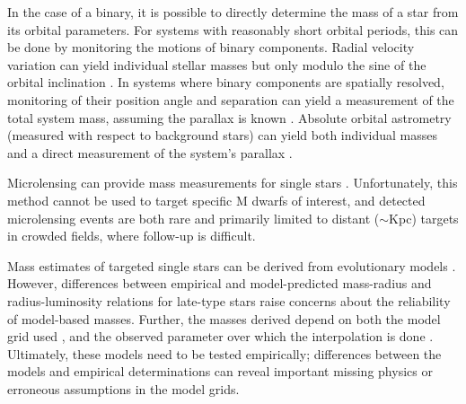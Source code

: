 \documentclass[twocolumn]{aastex62}
\begin{document}
In the case of a binary, it is possible to directly determine the mass of a star from its orbital parameters. For systems with reasonably short orbital periods, this can be done by monitoring the motions of binary components.  Radial velocity variation can yield individual stellar masses but only modulo the sine of the orbital inclination \citep[e.g.,][]{Torres2002,Kraus2011,Stevens:2018aa}. In systems where binary components are spatially resolved, monitoring of their position angle and separation can yield a measurement of the total system mass, assuming the parallax is known \citep[e.g.,][]{Soderhjelm1999,Woi2003,2009ApJ...699..168D}. Absolute orbital astrometry (measured with respect to background stars) can yield both individual masses and a direct measurement of the system's parallax \citep[e.g.,][]{Koh2012,Benedict2016}. 

Microlensing can provide mass measurements for single stars \citep[e.g.,][]{2016ApJ...825...60Z,2017ApJ...838..154C,2017AJ....154..176S}. Unfortunately, this method cannot be used to target specific M dwarfs of interest, and detected microlensing events are both rare and primarily limited to distant ($\sim$Kpc) targets in crowded fields, where follow-up is difficult. 

Mass estimates of targeted single stars can be derived from evolutionary models \citep[e.g.,][]{Muirhead2012a}. However, differences between empirical and model-predicted mass-radius and radius-luminosity relations for late-type stars \citep[e.g.,][]{Boyajian2012,Feiden2012a} raise concerns about the reliability of model-based masses. Further, the masses derived depend on both the model grid used \citep{Spada2013,MIST1}, and the observed parameter over which the interpolation is done \citep[e.g., color versus luminosity,][]{Mann:2012,Mann2015b}. Ultimately, these models need to be tested empirically; differences between the models and empirical determinations can reveal important missing physics or erroneous assumptions in the model grids. 
\end{document}
